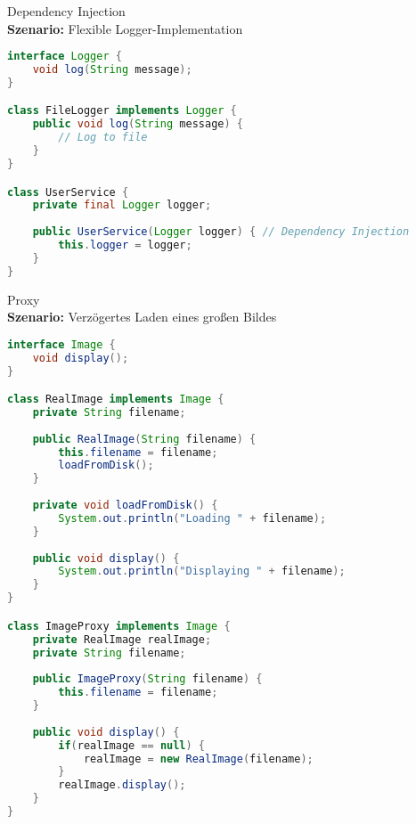 \begin{example2}{Dependency Injection}\\
\textbf{Szenario:} Flexible Logger-Implementation
\begin{lstlisting}[language=Java, style=base]
interface Logger {
    void log(String message);
}

class FileLogger implements Logger {
    public void log(String message) {
        // Log to file
    }
}

class UserService {
    private final Logger logger;
    
    public UserService(Logger logger) { // Dependency Injection
        this.logger = logger;
    }
}
\end{lstlisting}
\end{example2}

\begin{example2}{Proxy}\\
\textbf{Szenario:} Verzögertes Laden eines großen Bildes
\begin{lstlisting}[language=Java, style=base]
interface Image {
    void display();
}

class RealImage implements Image {
    private String filename;
    
    public RealImage(String filename) {
        this.filename = filename;
        loadFromDisk();
    }
    
    private void loadFromDisk() {
        System.out.println("Loading " + filename);
    }
    
    public void display() {
        System.out.println("Displaying " + filename);
    }
}

class ImageProxy implements Image {
    private RealImage realImage;
    private String filename;
    
    public ImageProxy(String filename) {
        this.filename = filename;
    }
    
    public void display() {
        if(realImage == null) {
            realImage = new RealImage(filename);
        }
        realImage.display();
    }
}
\end{lstlisting}
\end{example2}

